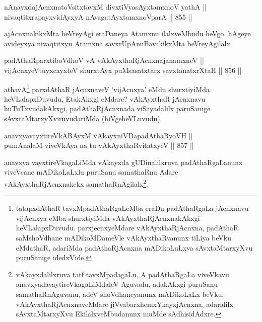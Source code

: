\begin{shl}
nAnayxdajAcnxnatoV\s sitxtavxM divxtiVyasAyx\s \s tamxnoV yathA || \\
nivaqtitxrapayxvidAyxyA nAvagatAyxtamxnoV\s parA \hfill || 855 ||  
\end{shl}

\begin{artha}
ajAcnxnakikxMta beVreyAgi eraDaneya Atamxnu ilalxveMbudu heVgo. hAgeye avideyxya nivaqtitxyu Atamxna savxrUpAnuBavakikxMta beVreyAgilalx.
\end{artha}


\begin{shl}
padAthaRparxtiboVdhoV vA vAkAyxthaRjAcnxnajanamxneV || \\
vijAcnxyeVtuyxcayxteV shurxtAyx puMsasatxtarx savxtanatxrXtaH \hfill || 856 ||  
\end{shl}

\begin{artha}
athavA\footnote{tatapxdAthaR tavxMpadAthaRgaLeMba eraDu padAthaRgaLa jAcnxnavu vijAcnxya eMba shurxtiyiMda vAkAyxthaRjAcnxnakAkxgi heVLalapxDuvudu. parxjecnxyeMdare vAkAyxthaRjAcnxna, padAthaR saMshoVdhane mADikoMDameVle vAkAyxthaRvanunx tiLiya beVku eMdathaR, adariMda padAthaRjAcnxna mADikoLuLxva sAvxtaMtarxyXvu puruSanige idedxVide.} parxdAthaR jAcnxnaveV `vijAcnxya' eMdu shurxtiyiMda heVLalapxDuvudu, EtakAkxgi eMdare? vAkAyxthaR jAcnxnavu huTuTxvudakAkxgi, padAthaRjAcnxnada viSayadalilx paruSanige sAvxtaMtarxyXviruvudariMda (hiVgeheVLuvudu)
\end{artha}


\begin{shl}
anavxyavayxtireVkABAyxM vAkayxniVDapadAthaRyoVH || \\
pumAnalaM viveVkAya na tu vAkAyxthaRvitatxyeV \hfill || 857 ||  
\end{shl}

\begin{artha}
anavxya vayxtireVkagaLiMda vAkayxda gUDinalilxruva padAthaRgaLanunx viveVcane mADikoLaLxlu puruSanu samathaRnu Adare vAkAyxthaRjAcnxnakekx samathaRnAgilalx\footnote{vAkayxdalilxruva tatf tavxMpadagaLu, A padAthaRgaLa viveVkavu anavxyadavaytireVkagaLiMdaleV Aguvadu, adakAkxgi puruSanu samathaRnAguvanu, adeV shoVdhaneyanunx mADikoLaLx beVku. vAkAyxthaRjAcnxnaveMdare jiVvabarxhemxYkayxjAcnxna, adaralilx sAvxtaMtarxyXvu EkilalxveMbudanunx muMde sAdhisidAdxre.}.
\end{artha}


